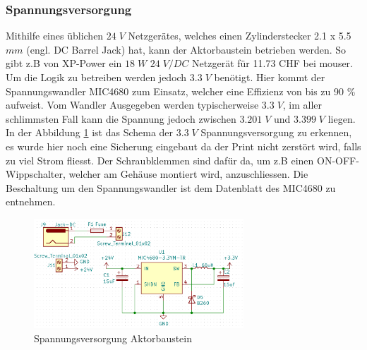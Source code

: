 \subsubsection{Spannungsversorgung}
Mithilfe eines üblichen $24\;V$ Netzgerätes, welches einen Zylinderstecker 2.1 x 5.5 $mm$ (engl. DC Barrel Jack) hat, kann der Aktorbaustein betrieben werden. So gibt z.B von XP-Power ein $18\;W$  $24\;V/DC$ Netzgerät für 11.73 CHF bei mouser. Um die Logik zu betreiben werden jedoch $3.3\;V$ benötigt. Hier kommt der Spannungswandler MIC4680 zum Einsatz, welcher eine Effizienz von bis zu 90 \% aufweist. Vom Wandler Ausgegeben werden typischerweise $3.3\;V$, im aller schlimmsten Fall kann die Spannung jedoch zwischen $3.201\;V$ und $3.399\;V$ liegen. In der Abbildung \ref{pic: Versorgung_aktor} ist das Schema der $3.3\;V$ Spannungsversorgung zu erkennen, es wurde hier noch eine Sicherung eingebaut da der Print nicht zerstört wird, falls zu viel Strom fliesst. Der Schraubklemmen sind dafür da, um z.B einen ON-OFF-Wippschalter, welcher am Gehäuse montiert wird, anzuschliessen. Die Beschaltung um den Spannungswandler ist dem Datenblatt des MIC4680 zu entnehmen.
\begin{figure}[h!]
	\centering
	\includegraphics[width=0.7\textwidth]{graphics/shematics_aktor_33V.png}
	\caption{Spannungsversorgung Aktorbaustein}
	\label{pic: Versorgung_aktor}
\end{figure}
\newpage
